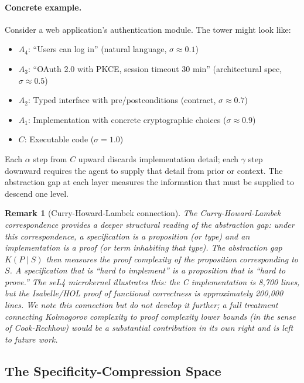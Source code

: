 \documentclass[11pt, a4paper, logo, copyright]{googledeepmind}
\newtheorem*{remark}{Remark}
\begin{document}
\paragraph{Concrete example.} Consider a web application's authentication module. The tower might look like:
\begin{itemize}[nosep]
    \item $A_4$: ``Users can log in'' (natural language, $\sigma \approx 0.1$)
    \item $A_3$: ``OAuth 2.0 with PKCE, session timeout 30 min'' (architectural spec, $\sigma \approx 0.5$)
    \item $A_2$: Typed interface with pre/postconditions (contract, $\sigma \approx 0.7$)
    \item $A_1$: Implementation with concrete cryptographic choices ($\sigma \approx 0.9$)
    \item $C$: Executable code ($\sigma = 1.0$)
\end{itemize}
Each $\alpha$ step from $C$ upward discards implementation detail; each $\gamma$ step downward requires the agent to supply that detail from prior or context. The abstraction gap at each layer measures the information that must be supplied to descend one level.

\begin{remark}[Curry-Howard-Lambek connection]
The Curry-Howard-Lambek correspondence \citep{martinlof1979constructive, wadler2015propositions, lambek1986higher} provides a deeper structural reading of the abstraction gap: under this correspondence, a specification is a proposition (or type) and an implementation is a proof (or term inhabiting that type). The abstraction gap $K(P \mid S)$ then measures the proof complexity of the proposition corresponding to $S$. A specification that is ``hard to implement'' is a proposition that is ``hard to prove.'' The seL4 microkernel illustrates this: the C implementation is 8,700 lines, but the Isabelle/HOL proof of functional correctness is approximately 200,000 lines. We note this connection but do not develop it further; a full treatment connecting Kolmogorov complexity to proof complexity lower bounds (in the sense of Cook-Reckhow) would be a substantial contribution in its own right and is left to future work.
\end{remark}

\subsection{The Specificity-Compression Space}
\end{document}

